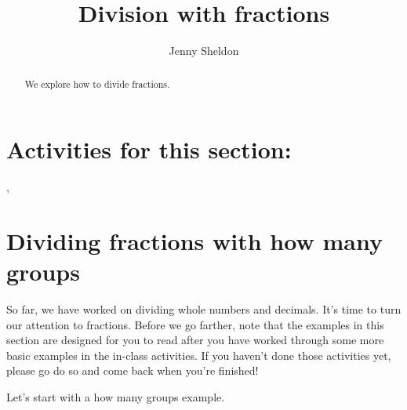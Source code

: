\documentclass{ximera}
\title{Division with fractions}
\author{Jenny Sheldon}
\begin{document}
\begin{abstract}
We explore how to divide fractions.
\end{abstract}
\maketitle

\section{Activities for this section:} 
, 

\section{Dividing fractions with how many groups}

So far, we have worked on dividing whole numbers and decimals. It's time to turn our attention to fractions. Before we go farther, note that the examples in this section are designed for you to read after you have worked through some more basic examples in the in-class activities. If you haven't done those activities yet, please go do so and come back when you're finished! 

Let's start with a how many groups example. 
\end{document}
